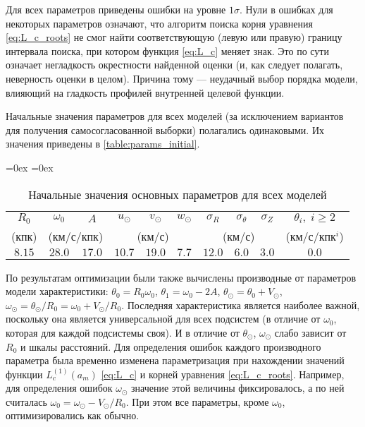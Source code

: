 \documentclass[a4paper, oneside, 14pt]{article}
\begin{document}
Для всех параметров приведены ошибки на уровне $ 1 \sigma $. Нули в ошибках для некоторых параметров означают, что алгоритм поиска корня уравнения \eqref{eq:L_c_roots} не смог найти соответствующую (левую или правую) границу интервала поиска, при котором функция \eqref{eq:L_c} меняет знак. Это по сути означает негладкость окрестности найденной оценки (и, как следует полагать, неверность оценки в целом). Причина тому --- неудачный выбор порядка модели, влияющий на гладкость профилей внутренней целевой функции.

Начальные значения параметров для всех моделей (за исключением вариантов для получения самосогласованной выборки) полагались одинаковыми. Их значения приведены в \autoref{table:params_initial}.

\begin{table}[H]
  \centering
  \caption{Начальные значения основных параметров для всех моделей}
  \aboverulesep=0ex
  \belowrulesep=0ex
  \renewcommand{\arraystretch}{1.25}
  \renewcommand\cellset{\renewcommand{\arraystretch}{0.7}}
  \begin{tabular}{cccccccccc}
    \toprule
    $ R_0 $ & $ \omega_0 $ & $ A $ & $ u_\odot $ & $ v_\odot $ & $ w_\odot $ & $ \sigma_R $ & $ \sigma_\theta $ & $ \sigma_Z $ & $ \theta_i, \; i \ge 2 $ \\
    (кпк) & \multicolumn{2}{c}{(км/с/кпк)} & \multicolumn{3}{c}{(км/с)} & \multicolumn{3}{c}{(км/с)} & (км/с/кпк$^i$) \\
    \midrule
    $ 8.15 $ & $ 28.0 $ & $ 17.0 $ & $ 10.7 $ & $ 19.0 $ & $ 7.7 $ & $ 12.0 $ & $ 6.0 $ & $ 3.0 $ & $ 0.0 $ \\
    \bottomrule
  \end{tabular}
  \label{table:params_initial}
\end{table}

По результатам оптимизации были также вычислены производные от параметров модели характеристики: $ \theta_0 = R_0 \omega_0 $, $ \theta_1 = \omega_0 - 2 A $, $ \theta_\odot = \theta_0 + V_\odot $, $ \omega_\odot = \theta_\odot / R_0 = \omega_0 + V_\odot / R_0 $. Последняя характеристика является наиболее важной, поскольку она является универсальной для всех подсистем (в отличие от $ \omega_0 $, которая для каждой подсистемы своя). И в отличие от $ \theta_\odot $, $ \omega_\odot $ слабо зависит от $ R_0 $ и шкалы расстояний. Для определения ошибок каждого производного параметра была временно изменена параметризация при нахождении значений функции $ L_c^{(1)}(a_m) $ \eqref{eq:L_c} и корней уравнения \eqref{eq:L_c_roots}. Например, для определения ошибок $ \omega_\odot $ значение этой величины фиксировалось, а по ней считалась $ \omega_0 = \omega_\odot - V_\odot / R_0 $. При этом все параметры, кроме $ \omega_0 $, оптимизировались как обычно.
\end{document}
